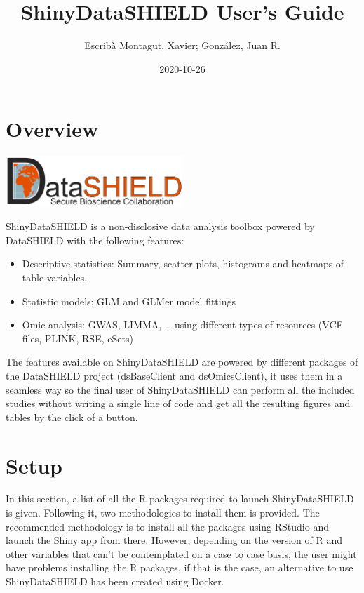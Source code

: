 \documentclass[
]{book}
\title{ShinyDataSHIELD User's Guide}
\author{Escribà Montagut, Xavier; González, Juan R.}
\date{2020-10-26}
\providecommand{\tightlist}{%
  \setlength{\itemsep}{0pt}\setlength{\parskip}{0pt}}
\begin{document}
\maketitle

{
\setcounter{tocdepth}{1}
\tableofcontents
}
\hypertarget{overview}{%
\chapter{Overview}\label{overview}}

\includegraphics[width=0.5\textwidth,height=\textheight]{images/ds_logo.png}

ShinyDataSHIELD is a non-disclosive data analysis toolbox powered by DataSHIELD with the following features:

\begin{itemize}
\tightlist
\item
  Descriptive statistics: Summary, scatter plots, histograms and heatmaps of table variables.
\item
  Statistic models: GLM and GLMer model fittings
\item
  Omic analysis: GWAS, LIMMA, \ldots{} using different types of resources (VCF files, PLINK, RSE, eSets)
\end{itemize}

The features available on ShinyDataSHIELD are powered by different packages of the DataSHIELD project (dsBaseClient and dsOmicsClient), it uses them in a seamless way so the final user of ShinyDataSHIELD can perform all the included studies without writing a single line of code and get all the resulting figures and tables by the click of a button.

\hypertarget{setup}{%
\chapter{Setup}\label{setup}}

In this section, a list of all the R packages required to launch ShinyDataSHIELD is given. Following it, two methodologies to install them is provided. The recommended methodology is to install all the packages using RStudio and launch the Shiny app from there. However, depending on the version of R and other variables that can't be contemplated on a case to case basis, the user might have problems installing the R packages, if that is the case, an alternative to use ShinyDataSHIELD has been created using Docker.
\end{document}
